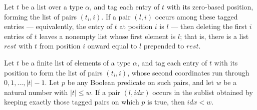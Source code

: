 \begin{lemma}
\label{SwitchingLemma.zipIdx_drop_spec}
\leanok
{}
Let $t$ be a list over a type $\alpha$, and tag each entry of $t$ with its zero-based
position, forming the list of pairs $(t_i, i)$. If a pair $(l, i)$ occurs among these
tagged entries — equivalently, the entry of $t$ at position $i$ is $l$ — then deleting
the first $i$ entries of $t$ leaves a nonempty list whose first element is $l$; that is,
there is a list $\mathit{rest}$ with $t$ from position $i$ onward equal to $l$ prepended
to $\mathit{rest}$.
\end{lemma}

\begin{lemma}
\label{SwitchingLemma.zipIdx_filter_idx_lt}
\leanok
{}
Let $t$ be a finite list of elements of a type $\alpha$, and tag each entry of $t$ with
its position to form the list of pairs $(t_i, i)$, whose second coordinates run through
$0, 1, \dots, |t| - 1$. Let $p$ be any Boolean predicate on such pairs, and let $w$ be a
natural number with $|t| \le w$. If a pair $(l, \mathit{idx})$ occurs in the sublist
obtained by keeping exactly those tagged pairs on which $p$ is true, then $\mathit{idx}
< w$.
\end{lemma}

